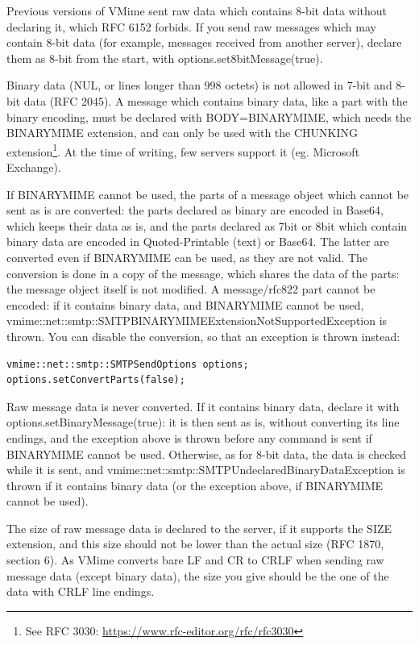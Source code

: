 Previous versions of VMime sent raw data which contains 8-bit data without
declaring it, which RFC 6152 forbids. If you send raw messages which may
contain 8-bit data (for example, messages received from another server),
declare them as 8-bit from the start, with {\vcode options.set8bitMessage(true)}.

Binary data (NUL, or lines longer than 998 octets) is not allowed in 7-bit
and 8-bit data (RFC 2045). A message which contains binary data, like a part
with the {\vcode binary} encoding, must be declared with {\vcode BODY=BINARYMIME},
which needs the BINARYMIME extension, and can only be used with the CHUNKING
extension\footnote{See RFC 3030: \url{https://www.rfc-editor.org/rfc/rfc3030}}.
At the time of writing, few servers support it (eg. Microsoft Exchange).

If BINARYMIME cannot be used, the parts of a message object which cannot be
sent as is are converted: the parts declared as binary are encoded in Base64,
which keeps their data as is, and the parts declared as 7bit or 8bit which
contain binary data are encoded in Quoted-Printable (text) or Base64. The
latter are converted even if BINARYMIME can be used, as they are not valid.
The conversion is done in a copy of the message, which shares the data of the
parts: the message object itself is not modified. A {\vcode message/rfc822}
part cannot be encoded: if it contains binary data, and BINARYMIME cannot be
used, {\vcode vmime::net::smtp::SMTPBINARYMIMEExtensionNotSupportedException}
is thrown. You can disable the conversion, so that an exception is thrown
instead:

\begin{lstlisting}
vmime::net::smtp::SMTPSendOptions options;
options.setConvertParts(false);
\end{lstlisting}

Raw message data is never converted. If it contains binary data, declare it
with {\vcode options.setBinaryMessage(true)}: it is then sent as is, without
converting its line endings, and the exception above is thrown before any
command is sent if BINARYMIME cannot be used. Otherwise, as for 8-bit data,
the data is checked while it is sent, and
{\vcode vmime::net::smtp::SMTPUndeclaredBinaryDataException} is thrown if it
contains binary data (or the exception above, if BINARYMIME cannot be used).

The size of raw message data is declared to the server, if it supports the
SIZE extension, and this size should not be lower than the actual size (RFC
1870, section 6). As VMime converts bare LF and CR to CRLF when sending raw
message data (except binary data), the size you give should be the one of the
data with CRLF line endings.

